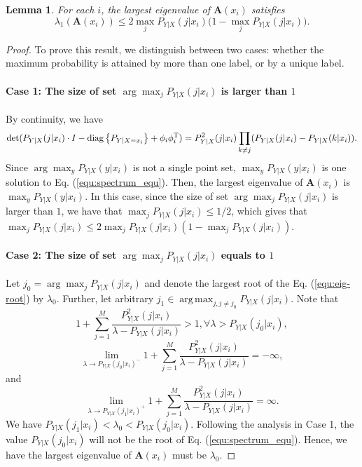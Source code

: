 \documentclass{article} %
\DeclareMathOperator*{\argmax}{arg\,max}
\theoremstyle{plain} %
\newtheorem{lemma}[theorem]{Lemma}          %
\begin{document}
\begin{lemma}\label{lem:upper-bound}
For each $i$, the largest eigenvalue of $\textbf{A}(x_i)$ satisfies
\[
\lambda_1(\textbf{A}(x_i)) \leq 2 \max_j P_{Y|X}(j|x_i)\big(1-\max_j P_{Y|X}(j|x_i)\big).
\]
\end{lemma}
\begin{proof}
To prove this result, we distinguish between two cases: whether the maximum probability is attained by more than one label, or by a unique label.

\paragraph{Case 1: The size of set $\arg\max_j P_{Y|X}(j|x_i)$ is larger than $1$}
By continuity, we have 
\begin{equation*}
\det(P_{Y|X}(j|x_i)\cdot I- {\rm diag}\left\{ P_{Y|X=x_i} \right\} + \phi_i\phi_i^\mathrm{T})= P_{Y|X}^2(j|x_i)\prod_{k\ne j}(P_{Y|X}(j|x_i)-P_{Y|X}(k|x_i)).
\end{equation*}
Since $\arg\max_y P_{Y|X}(y|x_i)$ is not a single point set, $\max_y P_{Y|X}(y|x_i)$ is one solution to Eq. (\ref{equ:spectrum_equ}). Then, the largest eigenvalue of $\mathbf{A}(x_i)$ is $\max_y P_{Y|X}(y|x_i)$. In this case, since the size of set  $\arg\max_j P_{Y|X}(j|x_i)$ is larger than $1$, we have that $\max_j P_{Y|X}(j|x_i) \leq 1/2$, which gives that $\max_j P_{Y|X}(j|x_i) \leq 2\max_j P_{Y|X}(j|x_i)(1-\max_j P_{Y|X}(j|x_i))$.

\paragraph{Case 2: The size of set  $\arg\max_j P_{Y|X}(j|x_i)$ equals to $1$}
Let $j_0=\arg\max_j P_{Y|X}(j|x_i)$ and denote the largest root of the Eq. (\ref{equ:eig-root}) by $\lambda_0$.
Further, let arbitrary $j_1\in\argmax_{j,j\ne j_0} P_{Y|X}(j|x_i)$. Note that
\begin{equation*}
    1+\sum_{j=1}^M\frac{P_{Y|X}^2(j|x_i)}{\lambda-P_{Y|X}(j|x_i)}>1,\forall\lambda>P_{Y|X}(j_0|x_i),
\end{equation*}
\begin{equation*}
    \lim_{\lambda\to P_{Y|X}(j_0|x_i)^-}1+\sum_{j=1}^M\frac{P_{Y|X}^2(j|x_i)}{\lambda-P_{Y|X}(j|x_i)}=-\infty,
\end{equation*}
and
\begin{equation*}
    \lim_{\lambda\to P_{Y|X}(j_1|x_i)^+}1+\sum_{j=1}^M\frac{P_{Y|X}^2(j|x_i)}{\lambda-P_{Y|X}(j|x_i)}=\infty.
\end{equation*}
We have $P_{Y|X}(j_1|x_i) < \lambda_0 <P_{Y|X}(j_0|x_i)$. Following the analysis in Case 1, the value $P_{Y|X}(j_0|x_i)$ will not be the root of Eq. (\ref{equ:spectrum_equ}). Hence, we have the largest eigenvalue of $\mathbf{A}(x_i)$ must be $\lambda_0$.


\end{proof}
\end{document}
